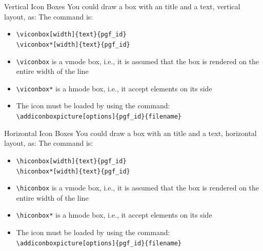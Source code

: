 \documentclass[english,sectioncirclenumberstyle]{ciadbeamer}
\begin{document}
\begin{frame}{Vertical Icon Boxes}
	You could draw a box with an title and a text, vertical layout, as:
	The command is:	
	\begin{itemize}
	\item \texttt{{\textbackslash}viconbox[width]\{text\}\{pgf\_id\}} \\
		\texttt{{\textbackslash}viconbox*[width]\{text\}\{pgf\_id\}} \\[.5cm]
	\item \texttt{{\textbackslash}viconbox} is a vmode box, i.e., it is assumed that the box is rendered on the entire width of the line
	\item \texttt{{\textbackslash}viconbox*} is a hmode box, i.e., it accept elements on its side
	\item \alert{The icon must be loaded by using the command:} \\
		\texttt{{\textbackslash}addiconboxpicture[options]\{pgf\_id\}\{filename\}}
	\end{itemize}
\end{frame}

\begin{frame}{Horizontal Icon Boxes}
	You could draw a box with an title and a text, horizontal layout, as:
	The command is:	
	\begin{itemize}
	\item \texttt{{\textbackslash}hiconbox[width]\{text\}\{pgf\_id\}} \\
		\texttt{{\textbackslash}hiconbox*[width]\{text\}\{pgf\_id\}} \\[.5cm]
	\item \texttt{{\textbackslash}hiconbox} is a vmode box, i.e., it is assumed that the box is rendered on the entire width of the line
	\item \texttt{{\textbackslash}hiconbox*} is a hmode box, i.e., it accept elements on its side
	\item \alert{The icon must be loaded by using the command:} \\
		\texttt{{\textbackslash}addiconboxpicture[options]\{pgf\_id\}\{filename\}}
	\end{itemize}
\end{frame}
\end{document}
